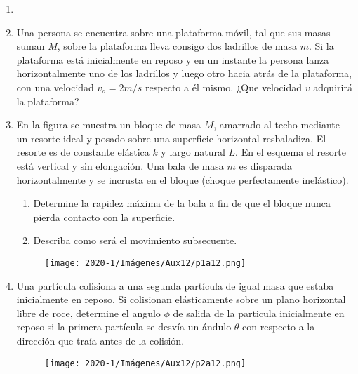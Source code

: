 \documentclass[letterpaper,11pt]{article}
\begin{document}
\vspace{-1cm}
\begin{enumerate}\setlength{\itemsep}{0.4cm}


\item[]

\item Una persona se encuentra sobre una plataforma móvil, tal que sus masas suman $M$, sobre la plataforma lleva consigo dos ladrillos de masa $m$. Si la plataforma está inicialmente en reposo y en un instante la persona lanza horizontalmente uno de los ladrillos y luego otro hacia atrás de la plataforma, con una velocidad $v_o= 2 m/s$ respecto a él mismo. ¿Que velocidad $v$ adquirirá la plataforma?


\item En la figura se  muestra un bloque de masa $M$, amarrado al techo mediante un resorte ideal y posado sobre una superficie horizontal resbaladiza. El resorte es de constante elástica $k$ y largo natural $L$. En el esquema el resorte está vertical y sin elongación. Una bala de masa $m$ es disparada horizontalmente y se incrusta en el bloque (choque perfectamente inelástico).
\begin{enumerate}
    \item Determine la rapidez máxima de la bala a fin de que el bloque nunca pierda contacto con la superficie.
    \item Describa como será el movimiento subsecuente.
\end{enumerate}

\begin{figure}[h!]
    \centering
    \texttt{[image: 2020-1/Imágenes/Aux12/p1a12.png]}
\end{figure}

\item Una partícula colisiona a una segunda partícula de igual masa que estaba inicialmente en reposo. Si colisionan elásticamente sobre un plano horizontal libre de roce, determine el angulo $\phi$ de salida de la particula inicialmente en reposo si la primera partícula se desvía un ándulo $\theta$ con respecto a la dirección que traía antes de la colisión.

\begin{figure}[h!]
    \centering
    \texttt{[image: 2020-1/Imágenes/Aux12/p2a12.png]}
\end{figure}



\end{enumerate}
\end{document}
